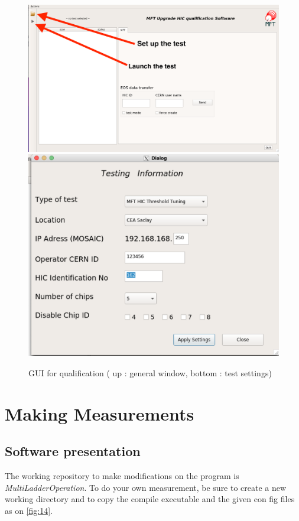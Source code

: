 \documentclass[12pt,oneside,a4]{article}
\begin{document}
\begin{figure}[h]
        \centering
        \includegraphics[scale =0.3]{figures/Interface_example_1.png}
        \includegraphics[scale =0.3]{figures/Interface_example_2.png}
        \caption{GUI for qualification ( up : general window, bottom : test settings)}
        \label{fig:9}
\end{figure}

\section{Making Measurements}
    \subsection{Software presentation}
The working repository to make modifications on the program is \textit{MultiLadderOperation}. To do your own measurement, be sure to create a new working directory and to copy the compile executable and the given con fig files as on \ref{fig:14}.
\end{document}
